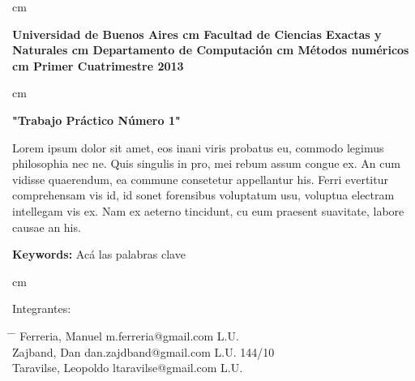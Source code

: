  cm
\begin{flushright}
\huge\bf Universidad de Buenos Aires
 cm
\Large\bf Facultad de Ciencias Exactas y Naturales
 cm
\Large\bf Departamento de Computaci\'on
 cm
\Large\bf  M\'etodos num\'ericos  
 cm
\Large\bf Primer Cuatrimestre 2013
\end{flushright}

 cm
\begin{center}
\LARGE\bf "Trabajo Pr\'actico N\'umero 1"

\vskip 1.0cm
\normalsize Lorem ipsum dolor sit amet, eos inani viris probatus eu, commodo legimus philosophia nec ne. Quis singulis in pro, mei rebum assum congue ex. An cum vidisse quaerendum, ea commune consetetur appellantur his. Ferri evertitur comprehensam vis id, id sonet forensibus voluptatum usu, voluptua electram intellegam vis ex. Nam ex aeterno tincidunt, cu eum praesent suavitate, labore causae an his.

\vskip 1.0cm
\large {\bf Keywords:} Ac\'a las palabras clave

\end{center}



 cm
\begin{flushleft}
\large Integrantes:
\begin{tabbing}
\hspace{5cm} \= \hspace{5.5cm} \= \hspace{3cm} \kill
Ferreria, Manuel \> m.ferreria@gmail.com \> L.U.  \\
Zajband, Dan \> dan.zajdband@gmail.com \> L.U. 144/10 \\
Taravilse, Leopoldo \> ltaravilse@gmail.com \> L.U.\\
\end{tabbing}
\end{flushleft}